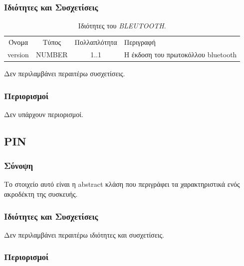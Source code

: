 \subsubsection*{Ιδιότητες και Συσχετίσεις}

\begin{table}[H]
	\begin{center}
		\begin{tabular}{ | c | c | c| m{5.5cm} | }
			\hline
			\rowcolor{Gray}
			\multicolumn{4}{|c|}{\textbf{Ιδιότητες}}\\
			\hline
			\rowcolor{Gray}
			Όνομα & Τύπος & Πολλαπλότητα & Περιγραφή \\
			\hline
			version & NUMBER & 1..1 & Η έκδοση του πρωτοκόλλου bluetooth \\
			\hline
		\end{tabular}
		\caption{Ιδιότητες του \textit{BLEUTOOTH}.}
		\label{tab:bluetooth}
	\end{center}
\end{table}

\noindent Δεν περιλαμβάνει περαιτέρω συσχετίσεις.

\subsubsection*{Περιορισμοί}

\noindent Δεν υπάρχουν περιορισμοί.

\subsection{PIN}
\label{subsec:pin}

\subsubsection*{Σύνοψη}

\noindent Το στοιχείο αυτό είναι η abstract κλάση που περιγράφει τα χαρακτηριστικά ενός ακροδέκτη της συσκευής.

\subsubsection*{Ιδιότητες και Συσχετίσεις}

\noindent Δεν περιλαμβάνει περαιτέρω ιδιότητες και συσχετίσεις.

\subsubsection*{Περιορισμοί}

